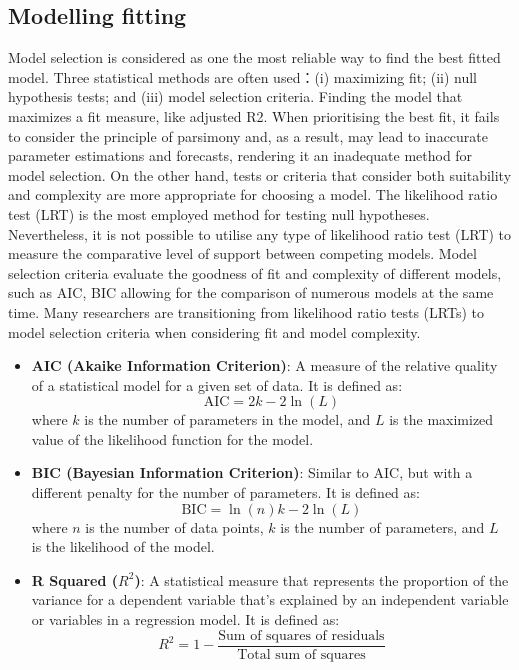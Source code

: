 \documentclass{article}
\begin{document}
\subsection{Modelling fitting}
Model selection is considered as one the most reliable way to find the best fitted model. 
Three statistical methods are often used：(i) maximizing fit; (ii) null hypothesis tests; and (iii) model selection criteria\cite{johnson2004}.  Finding the model that maximizes a fit measure, like adjusted R2. 
When prioritising the best fit, it fails to consider the principle of parsimony and, as a result, may lead to inaccurate parameter estimations and forecasts, rendering it an inadequate method for model selection. On the other hand, tests or criteria that consider both suitability and complexity are more appropriate for choosing a model.
The likelihood ratio test (LRT) is the most employed method for testing null hypotheses. Nevertheless, it is not possible to utilise any type of likelihood ratio test (LRT) to measure the comparative level of support between competing models.
Model selection criteria evaluate the goodness of fit and complexity of different models, such as AIC, BIC allowing for the comparison of numerous models at the same time. 
Many researchers are transitioning from likelihood ratio tests (LRTs) to model selection criteria when considering fit and model complexity\cite{posada2003}. 
\begin{itemize}
    \item \textbf{AIC (Akaike Information Criterion)}: 
    A measure of the relative quality of a statistical model for a given set of data. It is defined as:
    \begin{equation}
        \text{AIC} = 2k - 2\ln(L)
    \end{equation}
    where $k$ is the number of parameters in the model, and $L$ is the maximized value of the likelihood function for the model.
    
    \item \textbf{BIC (Bayesian Information Criterion)}: 
    Similar to AIC, but with a different penalty for the number of parameters. It is defined as:
    \begin{equation}
        \text{BIC} = \ln(n)k - 2\ln(L)
    \end{equation}
    where $n$ is the number of data points, $k$ is the number of parameters, and $L$ is the likelihood of the model.
    
    \item \textbf{R Squared ($R^2$)}: 
    A statistical measure that represents the proportion of the variance for a dependent variable that's explained by an independent variable or variables in a regression model. It is defined as:
    \begin{equation}
        R^2 = 1 - \frac{\text{Sum of squares of residuals}}{\text{Total sum of squares}}
    \end{equation}
\end{itemize}
\end{document}
